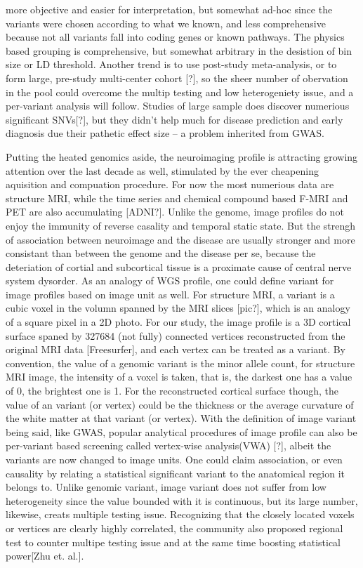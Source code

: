 \documentclass[twocolumn]{article}
\begin{document}
more objective and easier for interpretation, but somewhat ad-hoc since the variants were chosen according to what we known, and less comprehensive because not all variants fall into coding genes or known pathways. The physics based grouping is comprehensive, but somewhat arbitrary in the desistion of bin size or LD threshold. Another trend is to use post-study meta-analysis, or to form large, pre-study multi-center cohort [?], so the sheer number of obervation in the pool could overcome the multip testing and low heterogeniety issue, and a per-variant analysis will follow. Studies of large sample does discover numerious significant SNVs[?], but they didn't help much for disease prediction and early diagnosis due their pathetic effect size -- a problem inherited from GWAS.

Putting the heated genomics aside, the neuroimaging profile is attracting growing attention over the last decade as well, stimulated by the ever cheapening aquisition and compuation procedure. For now the most numerious data are structure MRI, while the time series and chemical compound based F-MRI and PET are also accumulating [ADNI?]. Unlike the genome, image profiles do not enjoy the immunity of reverse casality and temporal static state. But the strengh of association between neuroimage and the disease are usually stronger and more consistant than between the genome and the disease per se, because the deteriation of cortial and subcortical tissue is a proximate cause of central nerve system dysorder. As an analogy of WGS profile, one could define variant for image profiles based on image unit as well. For structure MRI, a variant is a cubic voxel in the volumn spanned by the MRI slices [pic?], which is an analogy of a square pixel in a 2D photo. For our study, the image profile is a 3D cortical surface spaned by 327684 (not fully) connected vertices reconstructed from the original MRI data [Freesurfer], and each vertex can be treated as a variant. By convention, the value of a genomic variant is the minor allele count, for structure MRI image, the intensity of a voxel is taken, that is, the darkest one has a value of 0, the brightest one is 1. For the reconstructed cortical surface though, the value of an variant (or vertex) could be the thickness or the average curvature of the white matter at that variant (or vertex). With the definition of image variant being said, like GWAS, popular analytical procedures of image profile can also be per-variant based screening called vertex-wise analysis(VWA) [?], albeit the variants are now changed to image units. One could claim association, or even causality by relating a statistical significant variant to the anatomical region it belongs to. Unlike genomic variant, image variant does not suffer from low heterogeneity since the value bounded with it is continuous, but its large number, likewise, creats multiple testing issue. Recognizing that the closely located voxels or vertices are clearly highly correlated, the community also proposed regional test to counter multipe testing issue and at the same time boosting statistical power[Zhu et. al.]. 
\end{document}
